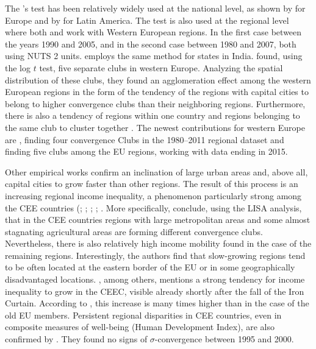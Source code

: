 \documentclass[11pt]{article}
\begin{document}
The \cite{phillips2007transition}'s test
has been relatively widely used at the national level, as shown by \citet{borsi2015evolution, fritsche2011analysing, monfort2013real,apergis2010old} for Europe and by \citet{rodriguez2014there} for Latin America. The test is also used at the regional level where both \citet{bartkowska2012regional} and \citet{pinho2010regional} work with Western European regions. In the first case between the years 1990 and 2005, and in the second case between 1980 and 2007, both using NUTS 2 units. \citet{ghosh2013regional} employs the same method for states in India. \citet{bartkowska2012regional} found, using the log $t$ test, five separate clubs in western Europe. Analyzing the spatial distribution of these clubs, they found an agglomeration effect among the western European regions in the form of the tendency of the regions with capital cities to belong to higher convergence clubs than their neighboring regions. Furthermore, there is also a tendency of regions within one country and regions belonging to the same club to cluster together \citep{bartkowska2012regional}. The newest contributions for western Europe are \citet{von2017regional}, finding four convergence Clubs in the 1980–2011 regional dataset and \citet{cutrini2019economic} finding five clubs among the EU regions, working with data ending in 2015. 

Other empirical works confirm an inclination of large urban areas and, above all, capital cities to grow faster than other regions. The result of this process is an increasing regional income inequality, a phenomenon particularly strong among the CEE countries (\citet{cuaresma2014determinants}; \citet{sme2012regional}; \citet{szendi2013convergence}; \citet{chapman2012income}; \citet{monastiriotis2011regional}. 
More specifically, \citet{sme2012regional} conclude, using the LISA analysis, that in the CEE countries regions with large metropolitan areas and some almost stagnating agricultural areas are forming different convergence clubs. Nevertheless, there is also relatively high income mobility found in the case of the remaining regions. Interestingly, the authors find that slow-growing regions tend to be often located at the eastern border of the EU or in some geographically disadvantaged locations. \citet{monastiriotis2011regional}, among others, mentions a strong tendency for income inequality to grow in the CEEC, visible already shortly after the fall of the Iron Curtain. According to \citeauthor{monastiriotis2011regional}, this increase is many times higher than in the case of the old EU members. Persistent regional disparities in CEE countries, even in composite measures of well-being (Human Development Index), are also confirmed by \citet{benedek2015paths}. They found no signs of $\sigma$-convergence between 1995 and 2000.  
\end{document}

